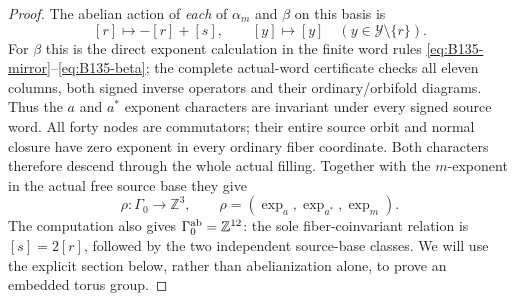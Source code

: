 \begin{proof}
The abelian action of \emph{each} of $\alpha_m$ and $\beta$
on this basis is
\begin{equation}\label{eq:B135-abelian-actions}
 [r]\longmapsto-[r]+[s],\qquad
 [y]\longmapsto[y]\quad(y\in\mathcal Y\setminus\{r\}).
\end{equation}
For $\beta$ this is the direct exponent calculation in the
finite word rules \eqref{eq:B135-mirror}--\eqref{eq:B135-beta};
the complete actual-word certificate checks all eleven columns,
both signed inverse operators and their ordinary/orbifold
diagrams. Thus the $a$ and $a^*$ exponent characters are
invariant under every signed source word. All forty nodes
are commutators; their entire source orbit and normal closure
have zero exponent in every ordinary fiber coordinate.
Both characters therefore descend through the whole actual
filling. Together with the $m$-exponent in the actual free
source base they give
\begin{equation}\label{eq:B135-rho}
 \rho:\Gamma_0\longrightarrow\mathbb Z^3,\qquad
 \rho=(\operatorname{exp}_a,\operatorname{exp}_{a^*},
                         \operatorname{exp}_m).
\end{equation}
The computation also gives $\Gamma_0^{\rm ab}=\mathbb Z^{12}$:
the sole fiber-coinvariant relation is $[s]=2[r]$, followed
by the two independent source-base classes. We will use the
explicit section below, rather than abelianization alone,
to prove an embedded torus group.


\end{proof}
